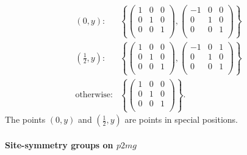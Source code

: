 \begin{align*}
  \left(0, y\right):
    &\left\{
      \left( \begin{array}{cc|c}
        1 & 0 & 0 \\
        0 & 1 & 0 \\
        \hline
        0 & 0 & 1 \\
      \end{array} \right),
      \left( \begin{array}{cc|c}
        -1 & 0 & 0 \\
        0 & 1 & 0 \\
        \hline
        0 & 0 & 1 \\
      \end{array} \right)
    \right\} \\
  \left(\frac{1}{2}, y\right):
    &\left\{
      \left( \begin{array}{cc|c}
        1 & 0 & 0 \\
        0 & 1 & 0 \\
        \hline
        0 & 0 & 1 \\
      \end{array} \right),
      \left( \begin{array}{cc|c}
        -1 & 0 & 1 \\
        0 & 1 & 0 \\
        \hline
        0 & 0 & 1 \\
      \end{array} \right)
    \right\} \\
  \mbox{otherwise}:
      &\left\{
      \left( \begin{array}{cc|c}
        1 & 0 & 0 \\
        0 & 1 & 0 \\
        \hline
        0 & 0 & 1 \\
      \end{array} \right)
      \right\}.
\end{align*}
The points $(0, y)$ and $\left( \frac{1}{2}, y \right)$ are points in special positions.

\paragraph{Site-symmetry groups on $p2mg$}

